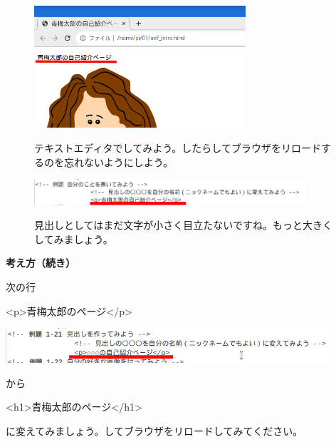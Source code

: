 \documentclass[a4paper,12pt]{jarticle}
\begin{document}
\begin{figure}[ht]
\begin{minipage}{\textwidth}
    \bigskip

    \includegraphics[width=0.7\textwidth]{textbook-img154.png}


    \bigskip

    テキストエディタでしてみよう。したらしてブラウザをリロードするのを忘れないようにしよう。


    \bigskip

    \includegraphics[width=0.9\textwidth]{textbook-img155.png}


    \bigskip


    見出しとしてはまだ文字が小さく目立たないですね。もっと大きくしてみましょう。




    \bigskip
  \end{minipage}

\end{figure}

\clearpage
\flushleft
\textbf{考え方（続き）}




次の行

{\textless}p{\textgreater}青梅太郎のページ{\textless}/p{\textgreater}

\bigskip

\includegraphics[width=0.9\textwidth]{textbook-img158.png}

から

{\textless}h1{\textgreater}青梅太郎のページ{\textless}/h1{\textgreater}

に変えてみましょう。してブラウザをリロードしてみてください。
\end{document}
